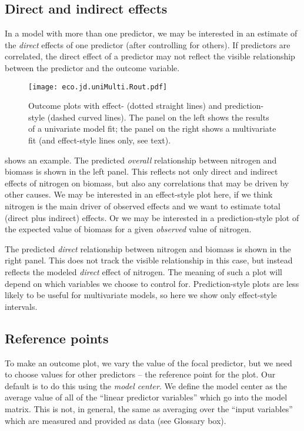 \subsection{Direct and indirect effects}

In a model with more than one predictor, we may be interested in an estimate of the \emph{direct} effects of one predictor (after controlling for others). If predictors are correlated, the direct effect of a predictor may not reflect the visible relationship between the predictor and the outcome variable.

\begin{figure}
\begin{center}
\texttt{[image: eco.jd.uniMulti.Rout.pdf]}
\caption{Outcome plots with effect- (dotted straight lines) and prediction-style (dashed curved lines). The panel on the left shows the results of a univariate model fit; the panel on the right shows a multivariate fit (and effect-style lines only, see text).}
\end{center}
\end{figure}

 shows an example. The predicted \emph{overall} relationship between nitrogen and biomass is shown in the left panel. This reflects not only direct and indirect effects of nitrogen on biomass, but also any correlations that may be driven by other causes. We may be interested in an effect-style plot here, if we think nitrogen is the main driver of observed effects and we want to estimate total (direct plus indirect) effects. Or we may be interested in a prediction-style plot of the expected value of biomass for a given \emph{observed} value of nitrogen.

The predicted \emph{direct} relationship between nitrogen and biomass is shown in the right panel. This does not track the visible relationship in this case, but instead reflects the modeled \emph{direct} effect of nitrogen. The meaning of such a plot will depend on which variables we choose to control for. Prediction-style plots are less likely to be useful for multivariate models, so here we show only effect-style intervals.

\subsection{Reference points}

To make an outcome plot, we vary the value of the focal predictor, but we need to choose values for other predictors -- the reference point for the plot. Our default is to do this using the \emph{model center}. We define the model center as the average value of all of the “linear predictor variables” which go into the model matrix. This is not, in general, the same as averaging over the “input variables” which are measured and provided as data (see Glossary box). 

